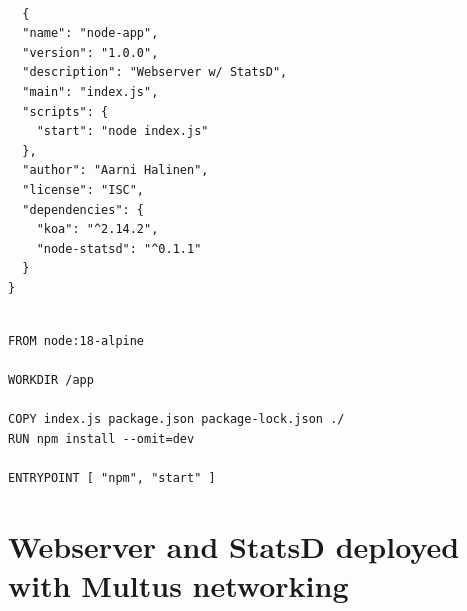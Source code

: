 \documentclass[english, 12pt, a4paper, sci, utf8, a-2b, online]{aaltothesis}
\begin{document}
\clearpage

\begin{lstlisting}[caption=\texttt{package.json}]

  {
  "name": "node-app",
  "version": "1.0.0",
  "description": "Webserver w/ StatsD",
  "main": "index.js",
  "scripts": {
    "start": "node index.js"
  },
  "author": "Aarni Halinen",
  "license": "ISC",
  "dependencies": {
    "koa": "^2.14.2",
    "node-statsd": "^0.1.1"
  }
}

\end{lstlisting}

\begin{lstlisting}[caption=Dockerfile for the server]

FROM node:18-alpine

WORKDIR /app

COPY index.js package.json package-lock.json ./
RUN npm install --omit=dev

ENTRYPOINT [ "npm", "start" ]

\end{lstlisting}

\clearpage

\section{Webserver and StatsD deployed with Multus networking} \label{app:multus-sidecar}
\end{document}
